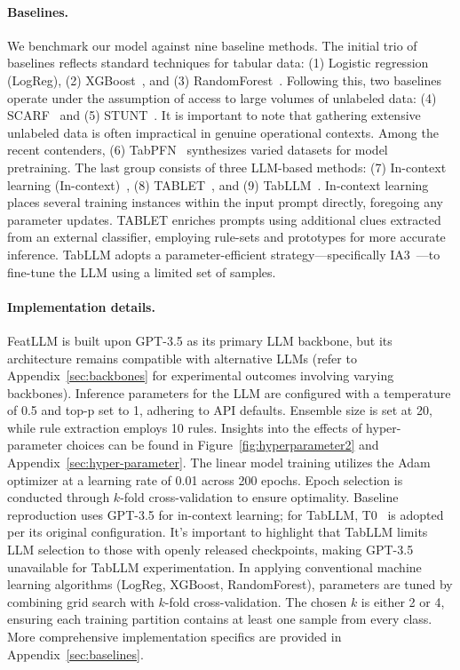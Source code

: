 \vspace*{-0.12in}
\paragraph{Baselines.}
We benchmark our model against nine baseline methods. The initial trio of baselines reflects standard techniques for tabular data: (1) Logistic regression (LogReg), (2) XGBoost~\cite{chen2016xgboost}, and (3) RandomForest~\cite{ho1995random}. Following this, two baselines operate under the assumption of access to large volumes of unlabeled data: (4) SCARF~\cite{bahri2022scarf} and (5) STUNT~\cite{nam2023stunt}. It is important to note that gathering extensive unlabeled data is often impractical in genuine operational contexts. Among the recent contenders, (6) TabPFN~\cite{hollmann2022tabpfn} synthesizes varied datasets for model pretraining. The last group consists of three LLM-based methods: (7) In-context learning (In-context)~\cite{wei2022emergent}, (8) TABLET~\cite{slack2023tablet}, and (9) TabLLM~\cite{hegselmann2023tabllm}. In-context learning places several training instances within the input prompt directly, foregoing any parameter updates. TABLET enriches prompts using additional clues extracted from an external classifier, employing rule-sets and prototypes for more accurate inference. TabLLM adopts a parameter-efficient strategy—specifically IA3~\cite{liu2022few}—to fine-tune the LLM using a limited set of samples.

\vspace*{-0.12in}
\paragraph{Implementation details.}
\textsf{FeatLLM} is built upon GPT-3.5 as its primary LLM backbone, but its architecture remains compatible with alternative LLMs (refer to Appendix~\ref{sec:backbones} for experimental outcomes involving varying backbones). Inference parameters for the LLM are configured with a temperature of 0.5 and top-p set to 1, adhering to API defaults. Ensemble size is set at 20, while rule extraction employs 10 rules. Insights into the effects of hyper-parameter choices can be found in Figure~\ref{fig:hyperparameter2} and Appendix~\ref{sec:hyper-parameter}.
The linear model training utilizes the Adam optimizer at a learning rate of 0.01 across 200 epochs. Epoch selection is conducted through $k$-fold cross-validation to ensure optimality. Baseline reproduction uses GPT-3.5 for in-context learning; for TabLLM, T0~\cite{sanh2022multitask} is adopted per its original configuration. It's important to highlight that TabLLM limits LLM selection to those with openly released checkpoints, making GPT-3.5 unavailable for TabLLM experimentation. In applying conventional machine learning algorithms (LogReg, XGBoost, RandomForest), parameters are tuned by combining grid search with $k$-fold cross-validation. The chosen $k$ is either 2 or 4, ensuring each training partition contains at least one sample from every class. More comprehensive implementation specifics are provided in Appendix~\ref{sec:baselines}.

